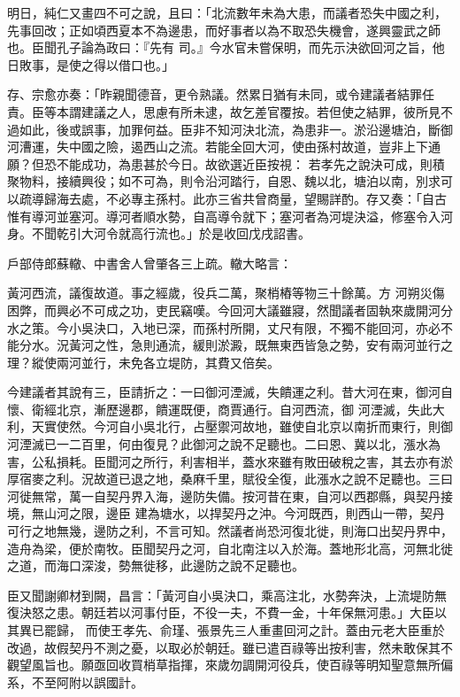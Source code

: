\begin{pinyinscope}
 明日，純仁又畫四不可之說，且曰：「北流數年未為大患，而議者恐失中國之利，先事回改；正如頃西夏本不為邊患，而好事者以為不取恐失機會，遂興靈武之師也。臣聞孔子論為政曰：『先有
 司。』今水官未嘗保明，而先示決欲回河之旨，他日敗事，是使之得以借口也。」



 存、宗愈亦奏：「昨親聞德音，更令熟議。然累日猶有未同，或令建議者結罪任責。臣等本謂建議之人，思慮有所未逮，故乞差官覆按。若但使之結罪，彼所見不過如此，後或誤事，加罪何益。臣非不知河決北流，為患非一。淤沿邊塘泊，斷御河漕運，失中國之險，遏西山之流。若能全回大河，使由孫村故道，豈非上下通願？但恐不能成功，為患甚於今日。故欲選近臣按視：
 若孝先之說決可成，則積聚物料，接續興役；如不可為，則令沿河踏行，自恩、魏以北，塘泊以南，別求可以疏導歸海去處，不必專主孫村。此亦三省共曾商量，望賜詳酌。存又奏：「自古惟有導河並塞河。導河者順水勢，自高導令就下；塞河者為河堤決溢，修塞令入河身。不聞乾引大河令就高行流也。」於是收回戊戌詔書。



 戶部侍郎蘇轍、中書舍人曾肇各三上疏。轍大略言：



 黃河西流，議復故道。事之經歲，役兵二萬，聚梢樁等物三十餘萬。方
 河朔災傷困弊，而興必不可成之功，吏民竊嘆。今回河大議雖寢，然聞議者固執來歲開河分水之策。今小吳決口，入地已深，而孫村所開，丈尺有限，不獨不能回河，亦必不能分水。況黃河之性，急則通流，緩則淤澱，既無東西皆急之勢，安有兩河並行之理？縱使兩河並行，未免各立堤防，其費又倍矣。



 今建議者其說有三，臣請折之：一曰御河湮滅，失饋運之利。昔大河在東，御河自懷、衛經北京，漸歷邊郡，饋運既便，商賈通行。自河西流，御
 河湮滅，失此大利，天實使然。今河自小吳北行，占壓禦河故地，雖使自北京以南折而東行，則御河湮滅已一二百里，何由復見？此御河之說不足聽也。二曰恩、冀以北，漲水為害，公私損耗。臣聞河之所行，利害相半，蓋水來雖有敗田破稅之害，其去亦有淤厚宿麥之利。況故道已退之地，桑麻千里，賦役全復，此漲水之說不足聽也。三曰河徙無常，萬一自契丹界入海，邊防失備。按河昔在東，自河以西郡縣，與契丹接境，無山河之限，邊臣
 建為塘水，以捍契丹之沖。今河既西，則西山一帶，契丹可行之地無幾，邊防之利，不言可知。然議者尚恐河復北徙，則海口出契丹界中，造舟為梁，便於南牧。臣聞契丹之河，自北南注以入於海。蓋地形北高，河無北徙之道，而海口深浚，勢無徙移，此邊防之說不足聽也。



 臣又聞謝卿材到闕，昌言：「黃河自小吳決口，乘高注北，水勢奔決，上流堤防無復決怒之患。朝廷若以河事付臣，不役一夫，不費一金，十年保無河患。」大臣以其異已罷歸，
 而使王孝先、俞瑾、張景先三人重畫回河之計。蓋由元老大臣重於改過，故假契丹不測之憂，以取必於朝廷。雖已遣百祿等出按利害，然未敢保其不觀望風旨也。願亟回收買梢草指揮，來歲勿調開河役兵，使百祿等明知聖意無所偏系，不至阿附以誤國計。




\end{pinyinscope}
